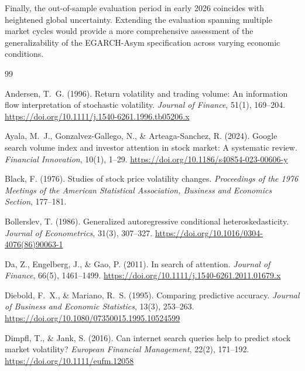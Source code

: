 \documentclass[12pt, a4paper]{article}
\begin{document}
Finally, the out-of-sample evaluation period in early 2026 coincides with heightened global uncertainty. Extending the evaluation spanning multiple market cycles would provide a more comprehensive assessment of the generalizability of the EGARCH-Asym specification across varying economic conditions.

\newpage

\begin{thebibliography}{99}

Andersen, T.~G. (1996).
\newblock Return volatility and trading volume: An information flow
  interpretation of stochastic volatility.
\newblock \textit{Journal of Finance}, 51(1), 169--204.
\newblock \url{https://doi.org/10.1111/j.1540-6261.1996.tb05206.x}

Ayala, M.~J., Gonzalvez-Gallego, N., \& Arteaga-Sanchez, R. (2024).
\newblock Google search volume index and investor attention in stock market: A
  systematic review.
\newblock \textit{Financial Innovation}, 10(1), 1--29.
\newblock \url{https://doi.org/10.1186/s40854-023-00606-y}

Black, F. (1976).
\newblock Studies of stock price volatility changes.
\newblock \textit{Proceedings of the 1976 Meetings of the American Statistical
  Association, Business and Economics Section}, 177--181.

Bollerslev, T. (1986).
\newblock Generalized autoregressive conditional heteroskedasticity.
\newblock \textit{Journal of Econometrics}, 31(3), 307--327.
\newblock \url{https://doi.org/10.1016/0304-4076(86)90063-1}

Da, Z., Engelberg, J., \& Gao, P. (2011).
\newblock In search of attention.
\newblock \textit{Journal of Finance}, 66(5), 1461--1499.
\newblock \url{https://doi.org/10.1111/j.1540-6261.2011.01679.x}

Diebold, F.~X., \& Mariano, R.~S. (1995).
\newblock Comparing predictive accuracy.
\newblock \textit{Journal of Business and Economic Statistics}, 13(3),
  253--263.
\newblock \url{https://doi.org/10.1080/07350015.1995.10524599}

Dimpfl, T., \& Jank, S. (2016).
\newblock Can internet search queries help to predict stock market volatility?
\newblock \textit{European Financial Management}, 22(2), 171--192.
\newblock \url{https://doi.org/10.1111/eufm.12058}


\end{thebibliography}
\end{document}

